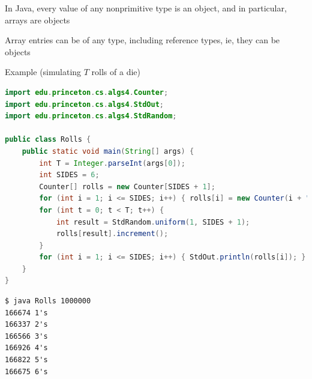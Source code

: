 \documentclass[8pt,a4paper,compress]{beamer}
\begin{document}
\begin{frame}[fragile]
In Java, every value of any nonprimitive type is an object, and in particular, arrays are objects 

\bigskip

Array entries can be of any type, including reference types, ie, they can be objects

\bigskip

Example (simulating $T$ rolls of a die)

\begin{lstlisting}[language=Java]
import edu.princeton.cs.algs4.Counter;
import edu.princeton.cs.algs4.StdOut;
import edu.princeton.cs.algs4.StdRandom;

public class Rolls {
    public static void main(String[] args) {
        int T = Integer.parseInt(args[0]);
        int SIDES = 6;
        Counter[] rolls = new Counter[SIDES + 1];
        for (int i = 1; i <= SIDES; i++) { rolls[i] = new Counter(i + "'s"); }
        for (int t = 0; t < T; t++) {
            int result = StdRandom.uniform(1, SIDES + 1);
            rolls[result].increment();
        }
        for (int i = 1; i <= SIDES; i++) { StdOut.println(rolls[i]); }
    }
}
\end{lstlisting}

\begin{lstlisting}[language={}]
$ java Rolls 1000000
166674 1's
166337 2's
166566 3's
166926 4's
166822 5's
166675 6's
\end{lstlisting}
\end{frame}
\end{document}
